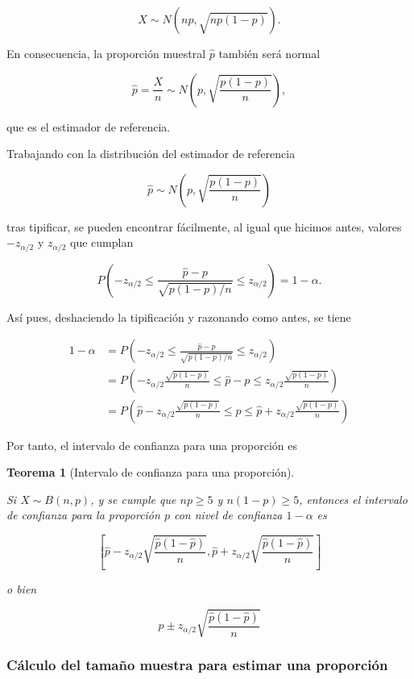 \documentclass[
  a4paper,
]{scrreport}
\theoremstyle{plain}
\newtheorem{theorem}{Teorema}[chapter]
\theoremstyle{definition}
\theoremstyle{definition}
\theoremstyle{remark}
\begin{document}
\[
X\sim N(np,\sqrt{np(1-p)}).
\]

En consecuencia, la proporción muestral \(\hat p\) también será normal

\[
\hat{p}=\frac{X}{n} \sim N\left(p,\sqrt{\frac{p(1-p)}{n}}\right),
\]

que es el estimador de referencia.

Trabajando con la distribución del estimador de referencia

\[
\hat p\sim N\left(p,\sqrt{\frac{p(1-p)}{n}}\right)
\]

tras tipificar, se pueden encontrar fácilmente, al igual que hicimos
antes, valores \(-z_{\alpha/2}\) y \(z_{\alpha/2}\) que cumplan

\[
P\left(-z_{\alpha/2}\leq \frac{\hat p-p}{\sqrt{p(1-p)/n}}\leq z_{\alpha/2} \right) = 1-\alpha.
\]

Así pues, deshaciendo la tipificación y razonando como antes, se tiene

\begin{align*}
1-\alpha 
&= P\left(-z_{\alpha/2}\leq \frac{\hat p-p}{\sqrt{p(1-p)/n}}\leq z_{\alpha/2} \right) \\
&= P\left(-z_{\alpha/2}\frac{\sqrt{p(1-p)}}{n}\leq \hat p-p\leq z_{\alpha/2}\frac{\sqrt{p(1-p)}}{n} \right) \\
&= P\left(\hat{p}-z_{\alpha/2}\frac{\sqrt{p(1-p)}}{n}\leq p\leq \hat{p}+z_{\alpha/2}\frac{\sqrt{p(1-p)}}{n} \right)
\end{align*}

Por tanto, el intervalo de confianza para una proporción es

\begin{theorem}[Intervalo de confianza para una
proporción]\protect\hypertarget{thm-intervalo-confianza-proporcion}{}\label{thm-intervalo-confianza-proporcion}

Si \(X\sim B(n,p)\), y se cumple que \(np\geq 5\) y \(n(1-p)\geq 5\),
entonces el \emph{intervalo de confianza para la proporción} \(p\) con
nivel de confianza \(1-\alpha\) es

\[
\left[\hat{p}-z_{\alpha/2}\sqrt{\frac{\hat{p}(1-\hat{p})}{n}},\hat{p}+z_{\alpha/2}\sqrt{\frac{\hat{p}(1-\hat{p})}{n}}\right]
\]

o bien

\[
\hat{p}\pm z_{\alpha/2}\sqrt{\frac{\hat{p}(1-\hat{p})}{n}}
\]

\end{theorem}

\subsubsection{Cálculo del tamaño muestra para estimar una
proporción}\label{cuxe1lculo-del-tamauxf1o-muestra-para-estimar-una-proporciuxf3n}
\end{document}
